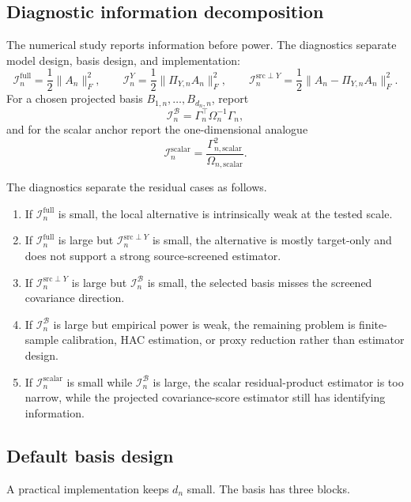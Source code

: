 \documentclass[11pt,a4paper]{amsart}
\theoremstyle{plain}
\theoremstyle{definition}
\theoremstyle{remark}
\newcommand{\scrB}{\mathcal{B}}
\newcommand{\scrI}{\mathcal{I}}
\begin{document}
\subsection{Diagnostic information decomposition}

The numerical study reports information before power.  The diagnostics separate model design,
basis design, and implementation:
\[
        \scrI_n^{\mathrm{full}}
        =
        \frac12\|A_n\|_F^2,
        \qquad
        \scrI_n^{Y}
        =
        \frac12\|\Pi_{Y,n}A_n\|_F^2,
        \qquad
        \scrI_n^{\mathrm{src}\perp Y}
        =
        \frac12\|A_n-\Pi_{Y,n}A_n\|_F^2.
\]
For a chosen projected basis \(B_{1,n},\dots,B_{d_n,n}\), report
\[
        \scrI_n^{\scrB}
        =
        \Gamma_n^\top\Omega_n^{-1}\Gamma_n,
\]
and for the scalar anchor report the one-dimensional analogue
\[
        \scrI_n^{\mathrm{scalar}}
        =
        \frac{\Gamma_{n,\mathrm{scalar}}^2}
        {\Omega_{n,\mathrm{scalar}}}.
\]

The diagnostics separate the residual cases as follows.
\begin{enumerate}[label=(\roman*)]
\item If \(\scrI_n^{\mathrm{full}}\) is small, the local alternative is intrinsically weak at the
tested scale.
\item If \(\scrI_n^{\mathrm{full}}\) is large but \(\scrI_n^{\mathrm{src}\perp Y}\) is small, the
alternative is mostly target-only and does not support a strong source-screened estimator.
\item If \(\scrI_n^{\mathrm{src}\perp Y}\) is large but \(\scrI_n^{\scrB}\) is small, the selected basis
misses the screened covariance direction.
\item If \(\scrI_n^{\scrB}\) is large but empirical power is weak, the remaining problem is finite-sample
calibration, HAC estimation, or proxy reduction rather than estimator design.
\item If \(\scrI_n^{\mathrm{scalar}}\) is small while \(\scrI_n^{\scrB}\) is large, the scalar
residual-product estimator is too narrow, while the projected covariance-score estimator still has
identifying information.
\end{enumerate}

\subsection{Default basis design}

A practical implementation keeps \(d_n\) small.  The basis has three blocks.
\end{document}
